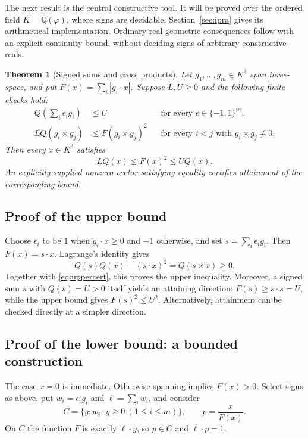\documentclass[11pt,a4paper]{article}
\newtheorem{theorem}{Theorem}[section]
\newcommand{\ph}{\varphi}
\newcommand{\Q}{\mathbb Q}
\newcommand{\abs}[1]{\left|#1\right|}
\begin{document}
The next result is the central constructive tool. It will be proved over the ordered field $K=\Q(\ph)$, where signs are decidable; Section~\ref{sec:ipra} gives its arithmetical implementation. Ordinary real-geometric consequences follow with an explicit continuity bound, without deciding signs of arbitrary constructive reals.

\begin{theorem}[Signed sums and cross products]\label{thm:finite}
Let $g_1,\ldots,g_m\in K^3$ span three-space, and put $F(x)=\sum_i\abs{g_i\cdot x}$. Suppose $L,U\ge0$ and the following finite checks hold:
\begin{align}
 Q\!\left(\sum_i\epsilon_i g_i\right)&\le U
 &&\text{for every }\epsilon\in\{-1,1\}^m,\label{eq:uppercert}\\
 LQ(g_i\times g_j)&\le F(g_i\times g_j)^2
 &&\text{for every }i<j\text{ with }g_i\times g_j\ne0.\label{eq:lowercert}
\end{align}
Then every $x\in K^3$ satisfies
\begin{equation}\label{eq:universal}
 LQ(x)\le F(x)^2\le UQ(x).
\end{equation}
An explicitly supplied nonzero vector satisfying equality certifies attainment of the corresponding bound.
\end{theorem}

\subsection{Proof of the upper bound}
Choose $\epsilon_i$ to be $1$ when $g_i\cdot x\ge0$ and $-1$ otherwise, and set $s=\sum_i\epsilon_i g_i$. Then $F(x)=s\cdot x$. Lagrange's identity gives
\[
 Q(s)Q(x)-(s\cdot x)^2=Q(s\times x)\ge0.
\]
Together with \eqref{eq:uppercert}, this proves the upper inequality. Moreover, a signed sum $s$ with $Q(s)=U>0$ itself yields an attaining direction: $F(s)\ge s\cdot s=U$, while the upper bound gives $F(s)^2\le U^2$. Alternatively, attainment can be checked directly at a simpler direction.

\subsection{Proof of the lower bound: a bounded construction}
The case $x=0$ is immediate. Otherwise spanning implies $F(x)>0$. Select signs as above, put $w_i=\epsilon_i g_i$ and $\ell=\sum_iw_i$, and consider
\[
 C=\{y:w_i\cdot y\ge0\ (1\le i\le m)\},\qquad
 p=\frac{x}{F(x)}.
\]
On $C$ the function $F$ is exactly $\ell\cdot y$, so $p\in C$ and $\ell\cdot p=1$.
\end{document}
